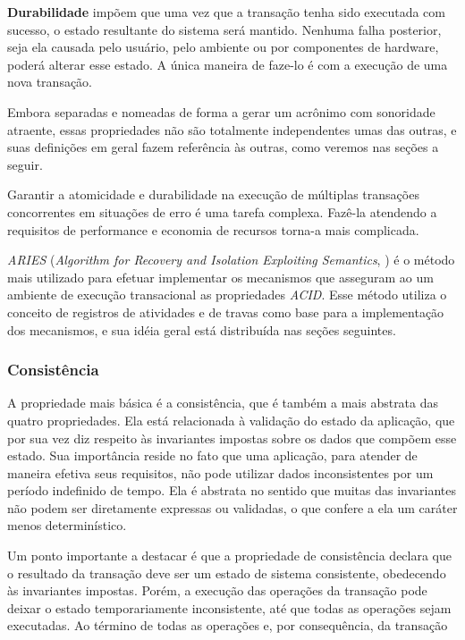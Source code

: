 \documentclass[11pt,twoside,a4paper]{book}
\begin{document}
\textbf{Durabilidade} impõem que uma vez que a transação tenha sido executada com sucesso, o estado resultante do sistema será mantido. Nenhuma falha posterior, seja ela causada pelo usuário, pelo ambiente ou por componentes de hardware, poderá alterar esse estado. A única maneira de faze-lo é com a execução de uma nova transação.

Embora separadas e nomeadas de forma a gerar um acrônimo com sonoridade atraente, essas propriedades não são totalmente independentes umas das outras, e suas definições em geral fazem referência às outras, como veremos nas seções a seguir.

Garantir a atomicidade e durabilidade na execução de múltiplas transações concorrentes em situações de erro é uma tarefa complexa. Fazê-la atendendo a requisitos de performance e economia de recursos torna-a mais complicada. 

\emph{ARIES} (\emph{Algorithm for Recovery and Isolation Exploiting Semantics}, \cite{aries}) é o método mais utilizado para efetuar implementar os mecanismos que asseguram ao um ambiente de execução transacional as propriedades \emph{ACID}. Esse método utiliza o conceito de registros de atividades e de travas como base para a implementação dos mecanismos, e sua idéia geral está distribuída nas seções seguintes.

\subsubsection*{Consistência}
A propriedade mais básica é a consistência, que é também a mais abstrata das quatro propriedades. Ela está relacionada à validação do estado da aplicação, que por sua vez diz respeito às invariantes impostas sobre os dados que compõem esse estado. Sua importância reside no fato que uma aplicação, para atender de maneira efetiva seus requisitos, não pode utilizar dados inconsistentes por um período indefinido de tempo. Ela é abstrata no sentido que muitas das invariantes não podem ser diretamente expressas ou validadas, o que confere a ela um caráter menos determinístico.

Um ponto importante a destacar é que a propriedade de consistência declara que o resultado da transação deve ser um estado de sistema consistente, obedecendo às invariantes impostas. Porém, a execução das operações da transação pode deixar o estado temporariamente inconsistente, até que todas as operações sejam executadas. Ao término de todas as operações e, por consequência, da transação
\end{document}

